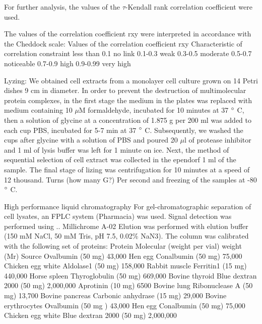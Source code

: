 \documentclass[a4paper,12pt]{article}
\begin{document}
For further analysis,
the values of
the $\tau$-Kendall rank correlation coefficient
 were used.


The values of the correlation coefficient rxy were interpreted in accordance with the Cheddock scale:
Values of the correlation coefficient rxy Characteristic of correlation constraint
less than 0.1 no link
0.1-0.3 weak
0.3-0.5 moderate
0.5-0.7 noticeable
0.7-0.9 high
0.9-0.99 very high
\cite{tinevez2017trackmate}

\cite{mclean2018trajr}
Lyzing:
We obtained cell extracts from a monolayer cell culture grown on 14 Petri dishes 9 cm in diameter.
In order to prevent the destruction of multimolecular protein complexes, in the first stage the medium in the plates was replaced with medium containing 10 $\mu$M formaldehyde, incubated for 10 minutes at 37 $\degree$ C, then a solution of glycine at a concentration of 1.875 g per 200 ml was added to each cup PBS, incubated for 5-7 min at 37 $\degree$  C. Subsequently, we washed the cups after glycine with a solution of PBS and poured 20 $\mu$l of protease inhibitor and 1 ml of lysis buffer was left for 1 minute on ice.
Next, the method of sequential selection of cell extract was collected in the ependorf 1 ml of the sample. The final stage of lizing was centrifugation for 10 minutes at a speed of 12 thousand. Turns (how many G?) Per second and freezing of the samples at -80 $\degree$  C.

High performance liquid chromatography
For gel-chromatographic separation of cell lysates, an FPLC system (Pharmacia) was used.
Signal detection was performed using .. Millichrome A-02
Elution was performed with elution buffer (150 mM NaCl, 50 mM Tris, pH 7.5, 0.02\% NaN3).
The column was calibrated with the following set of proteins:
Protein Molecular (weight per vial) weight (Mr) Source Ovalbumin (50 mg) 43,000 Hen egg Conalbumin (50 mg) 75,000 Chicken egg white Aldolase1 (50 mg) 158,000 Rabbit muscle Ferritin1 (15 mg) 440,000 Horse spleen Thyroglobulin (50 mg) 669,000 Bovine thyroid Blue dextran 2000 (50 mg) 2,000,000 Aprotinin (10 mg) 6500 Bovine lung Ribonuclease A (50 mg) 13,700 Bovine pancreas Carbonic anhydrase (15 mg) 29,000 Bovine erythrocytes Ovalbumin (50 mg ) 43,000 Hen egg Conalbumin (50 mg) 75,000 Chicken egg white Blue dextran 2000 (50 mg) 2,000,000
\end{document}
